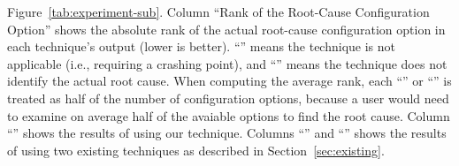 \begin{figure*}[t]
{{Figure~\ref{tab:experiment-sub}. 
Column ``Rank of the Root-Cause Configuration Option'' shows the
absolute rank of the actual root-cause
configuration option in each technique's output (lower is better).
``\x'' means the technique is not applicable (i.e., requiring a crashing
point), and ``\n'' means the technique does not identify the actual root cause.
When computing the average rank, each ``\x'' or ``\n'' is treated as
half of the number of configuration options, because a user would need to examine
on average half of the avaiable options to find the root cause.
Column ``\ourtool'' shows the results
of using our technique. Columns ``\prevtool'' and ``\conftool'' shows
the results of using two existing techniques as described in Section~\ref{sec:existing}.
}
}
\end{figure*}
